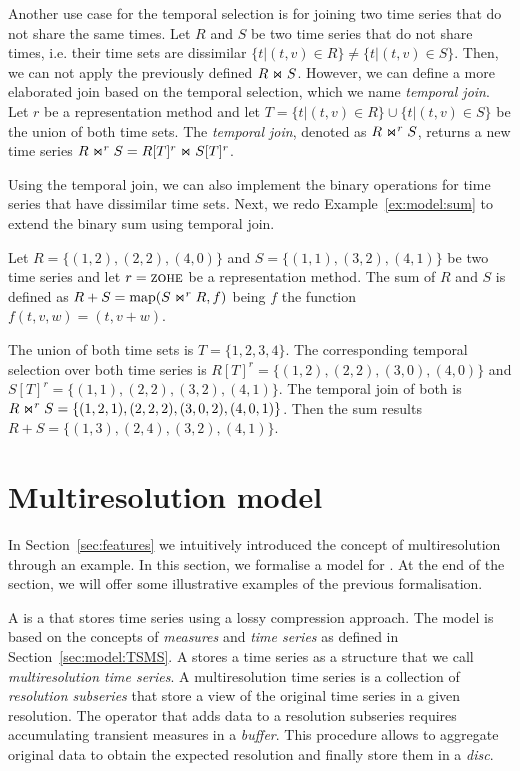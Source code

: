 Another use case for the temporal selection is for joining two time
series that do not share the same times. Let $R$ and $S$ be two time
series that do not share times, i.e. their time sets are dissimilar
$\{t | (t,v) \in R\} \neq \{t | (t,v) \in S\}$. Then, we can not apply
the previously defined $R \Join S$.  However, we can define a more
elaborated join based on the temporal selection, which we name
\emph{temporal join}.  Let $r$ be a representation method and let
$T=\{t | (t,v) \in R\} \cup \{t | (t,v) \in S\}$ be the union of both
time sets.  The \emph{temporal join}, denoted as $R \Join^r S$,
returns a new time series $R \Join^r S = R[T]^r \Join S[T]^r$.

Using the temporal join, we can also implement the binary operations
for time series that have dissimilar time sets. Next, we redo
Example~\ref{ex:model:sum} to extend the binary sum using temporal
join.

\begin{example}
  \label{ex:m:sumtemporal}
  Let $R=\{(1,2), (2,2), (4,0)\}$ and $S=\{(1,1), (3,2), (4,1)\}$ be
  two time series and let $r=\zohe{}$ be a representation method.  
  The sum of $R$ and $S$ is defined as $R+S=\operatorname*{map}(S\Join^r R, f)$ being
  $f$ the function $f(t,v,w)=(t,v+ w)$.

  The union of both time sets is $T=\{1,2,3,4\}$. The corresponding
  temporal selection over both time series is $R[T]^r=\{
  (1,2),\allowbreak (2,2), (3,0),\allowbreak (4,0)\}$ and
  $S[T]^r=\{(1,1),\allowbreak (2,2),\allowbreak (3,2), (4,1)\}$.  The
  temporal join of both is $R \Join^r S=\{ (1,2,1),\allowbreak (2,2,2), (3,0,2),
  (4,0,1)\}$.  Then the sum results $R+S= \{(1,3),\allowbreak (2,4), (3,2),
  (4,1)\}$.
\end{example}




\section{Multiresolution model}
\label{sec:MTSMS}

In Section~\ref{sec:features} we intuitively introduced the concept of
multiresolution through an example. In this section, we formalise a
model for . At the end of the section, we will offer some
illustrative examples of the previous formalisation.

A  is a  that stores time series using a lossy
compression approach. The  model is based on the concepts
of \emph{measures} and \emph{time series} as defined in
Section~\ref{sec:model:TSMS}.  A  stores a time series as
a structure that we call \emph{multiresolution time series}. A
multiresolution time series is a collection of \emph{resolution
  subseries} that store a view of the original time series in a given
resolution. The operator that adds data to a resolution subseries
requires accumulating transient measures in a \emph{buffer}. This
procedure allows to aggregate original data to obtain the expected
resolution and finally store them in a \emph{disc}.


